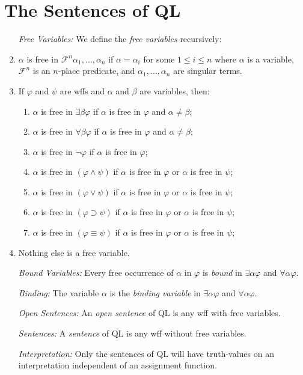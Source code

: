 \documentclass[a4paper, 11pt]{article} %
\begin{document}
\section*{The Sentences of QL}

\begin{enumerate}
  \item[\it Free Variables:] We define the \textit{free variables} recursively:
  \item $\alpha$ is free in $\mathcal{F}^n\alpha_1,\ldots,\alpha_n$ if $\alpha=\alpha_i$ for some $1\leq i\leq n$ where $\alpha$ is a variable, $\mathcal{F}^n$ is an $n$-place predicate, and $\alpha_1,\ldots,\alpha_n$ are singular terms.
  \item If $\varphi$ and $\psi$ are wffs and $\alpha$ and $\beta$ are variables, then:
    \begin{enumerate}
        \item $\alpha$ is free in $\exists\beta\varphi$ if $\alpha$ is free in $\varphi$ and $\alpha\neq\beta$;
        \item $\alpha$ is free in $\forall\beta\varphi$ if $\alpha$ is free in $\varphi$ and $\alpha\neq\beta$;
        \item $\alpha$ is free in $\neg\varphi$ if $\alpha$ is free in $\varphi$;
        \item $\alpha$ is free in $(\varphi\wedge\psi)$ if $\alpha$ is free in $\varphi$ or $\alpha$ is free in $\psi$;
        \item $\alpha$ is free in $(\varphi\vee\psi)$ if $\alpha$ is free in $\varphi$ or $\alpha$ is free in $\psi$;
        \item $\alpha$ is free in $(\varphi\supset\psi)$ if $\alpha$ is free in $\varphi$ or $\alpha$ is free in $\psi$;
        \item $\alpha$ is free in $(\varphi\equiv\psi)$ if $\alpha$ is free in $\varphi$ or $\alpha$ is free in $\psi$;
    \end{enumerate}
  \item Nothing else is a free variable. 
  \item[\it Bound Variables:] Every free occurrence of $\alpha$ in $\varphi$ is \textit{bound} in $\exists\alpha\varphi$ and $\forall\alpha\varphi$. 
  \item[\it Binding:] The variable $\alpha$ is the \textit{binding variable} in $\exists\alpha\varphi$ and $\forall\alpha\varphi$.
  \item[\it Open Sentences:] An \textit{open sentence} of QL is any wff with free variables.
  \item[\it Sentences:] A \textit{sentence} of QL is any wff without free variables.
  \item[\it Interpretation:] Only the sentences of QL will have truth-values on an interpretation independent of an assignment function.
\end{enumerate}
\end{document}
